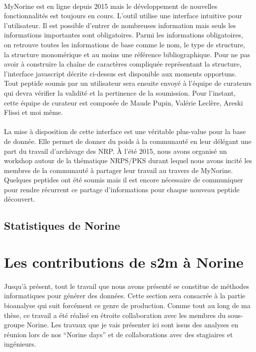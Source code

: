 \documentclass[12pt,french,twoside]{report}
\begin{document}
\paragraph{}MyNorine est en ligne depuis 2015 mais le développement de nouvelles fonctionnalités est toujours en cours.
L'outil utilise une interface intuitive pour l'utilisateur.
Il est possible d'entrer de nombreuses information mais seuls les informations importantes sont obligatoires.
Parmi les informations obligatoires, on retrouve toutes les informations de base comme le nom, le type de structure, la structure monomérique et au moins une référence bibliographique.
Pour ne pas avoir à construire la chaîne de caractères compliquée représentant la structure, l'interface javascript décrite ci-dessus est disponible aux moments opportuns.
Tout peptide soumis par un utilisateur sera ensuite envoyé à l'équipe de curateurs qui devra vérifier la validité et la pertinence de la soumission.
Pour l'instant, cette équipe de curateur est composée de Maude Pupin, Valérie Leclère, Areski Flissi et moi même.

\paragraph{}La mise à disposition de cette interface est une véritable plus-value pour la base de donnée.
Elle permet de donner du poids à la communauté en leur délégant une part du travail d'archivage des NRP.
À l'été 2015, nous avons organisé un workshop autour de la thématique NRPS/PKS durant lequel nous avons incité les membres de la communauté à partager leur travail au travers de MyNorine.
Quelques peptides ont été soumis mais il est encore nécessaire de communiquer pour rendre récurrent ce partage d'informations pour chaque nouveau peptide découvert.


\subsection{Statistiques de Norine}








\section{Les contributions de s2m à Norine}

\paragraph{}Jusqu'à présent, tout le travail que nous avons présenté se constitue de méthodes informatiques pour générer des données.
Cette section sera consacrée à la partie bioanalyse qui suit forcément ce genre de production.
Comme tout au long de ma thèse, ce travail a été réalisé en étroite collaboration avec les membres du sous-groupe Norine.
Les travaux que je vais présenter ici sont issus des analyses en réunion lors de nos ``Norine days'' et de collaborations avec des stagiaires et ingénieurs.
\end{document}
